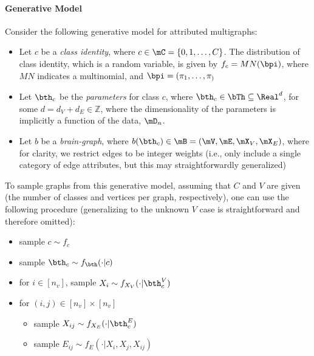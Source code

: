 \paragraph{Generative Model}

Consider the following generative model for attributed multigraphs:

\begin{itemize}
	\item Let $c$ be a \emph{class identity}, where $c \in \mC=\{0,1,\ldots, C\}$.  The distribution of class identity, which is a random variable, is given by $f_c=MN(\bpi)$, where $MN$ indicates a multinomial, and $\bpi=(\pi_1, \ldots, \pi_)$
	\item Let $\bth_c$ be the \emph{parameters} for class $c$, where $\bth_c \in \bTh \subseteq \Real^{d}$, for some $d=d_{V}+d_{E} \in \mathbb{Z}$, where the dimensionality of the parameters is implicitly a function of the data, $\mD_n$.
	\item Let $b$ be a \emph{brain-graph}, where $b(\bth_c) \in \mB=(\mV, \mE, \mX_V, \mX_E)$, where for clarity, we restrict edges to be integer weights (i.e., only include a single category of edge attributes, but this may straightforwardly generalized)%
\end{itemize}

To sample graphs from this generative model, assuming that $C$ and $V$ are given (the number of classes and vertices per graph, respectively), one can use the following procedure (generalizing to the unknown $V$ case is straightforward and therefore omitted):

\begin{itemize}
	\item sample $c \sim f_c$
	\item sample $\bth_c \sim f_{\bth}(\cdot | c)$
	\item for $i \in [n_v]$, sample $X_i \sim f_{X_V}(\cdot | \bth_c^V)$
	\item for $(i,j) \in [n_v] \times [n_v]$
	\begin{itemize}
		\item sample $X_{ij} \sim f_{X_E}(\cdot | \bth_c^E)$
		\item  sample $E_{ij} \sim f_E(\cdot | X_i, X_j, X_{ij})$
	\end{itemize}
\end{itemize}

% 
% 

